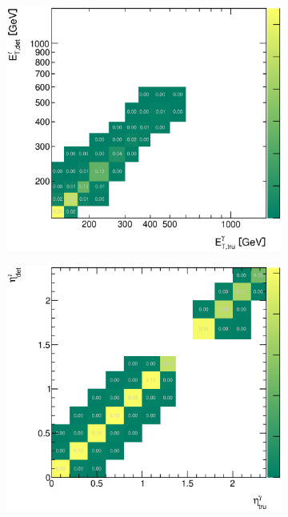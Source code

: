 \documentclass[12pt, twoside]{article}
\numberwithin{equation}{section}
\numberwithin{figure}{section}
\newenvironment{changemargin}[2]{%
\begin{list}{}{%
\setlength{\topsep}{0pt}%
\setlength{\leftmargin}{#1}%
\setlength{\rightmargin}{#2}%
\setlength{\listparindent}{\parindent}%
\setlength{\itemindent}{\parindent}%
\setlength{\parsep}{\parskip}%
}%
\item[]}{\end{list}}
\begin{document}
\begin{figure}
    \centering
    \checkoddpage
    \ifoddpage
        \begin{changemargin}{-1.0cm}{-0.75cm}
    \else
        \begin{changemargin}{-0.75cm}{-1.0cm}
    \fi
        \begin{subfigure}[b]{0.37\textwidth}
            \includegraphics[width=\textwidth]{./images/CorrelationMatricesPythia/REC_vs_HAD(DP+FP)-101.eps}
            \subcaption{}
            \label{fig:PythiaCorrelationEtPhoton}
        \end{subfigure}
        \begin{subfigure}[b]{0.37\textwidth}
            \includegraphics[width=\textwidth]{./images/CorrelationMatricesPythia/REC_vs_HAD(DP+FP)-102.eps}

\end{subfigure}
\end{changemargin}
\end{changemargin}
\end{figure}
\end{document}
